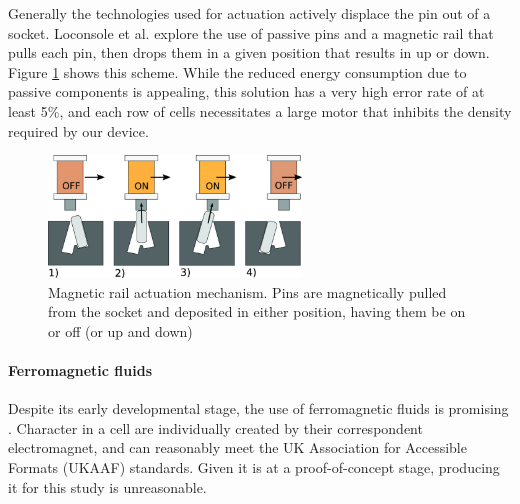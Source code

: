 Generally the technologies used for actuation actively displace the pin out of a socket.
Loconsole et al. \cite{loconsole_braillecursor_2019} explore the use of passive pins and a magnetic rail that pulls each pin, then drops them in a given position that results in up or down. Figure \ref{fig:magnetic-rail} shows this scheme.
While the reduced energy consumption due to passive components is appealing, this solution has a very high error rate of at least 5\%, and each row of cells necessitates a large motor that inhibits the density required by our device.
\begin{figure}[h]
\centering
    \includegraphics[width=0.6\textwidth]{figures/magnetic-rail.jpg}
\caption{Magnetic rail actuation mechanism. Pins are magnetically pulled from the socket and deposited in either position, having them be on or off (or up and down)}
\label{fig:magnetic-rail}
\end{figure}  

\paragraph{Ferromagnetic fluids}
Despite its early developmental stage, the use of ferromagnetic fluids is promising \cite{fletcher_magnetic_2021}.
Character in a cell are individually created by their correspondent electromagnet, and can reasonably meet the UK Association for Accessible Formats (UKAAF) standards.
Given it is at a proof-of-concept stage, producing it for this study is unreasonable.